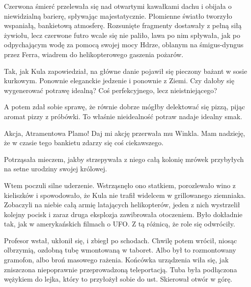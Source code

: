 Czerwona śmierć przelewała się nad otwartymi kawałkami dachu i obijała o niewidzialną barierę, spływając majestatycznie.
Płomienne światło tworzyło wspaniałą, bankietową atmosferę.
Rozsunięte fragmenty dostawały z pełną siłą żywiołu, lecz czerwone futro wcale się nie paliło, lawa po nim spływała, 
jak po odpychającym wodę za pomocą swojej mocy Hdrze, oblanym na śmigus-dyngus przez Ferra, wiadrem do helikopterowego gaszenia pożarów.

Tak, jak Kula zapowiedział, na główne danie pojawił się pieczony bażant w sosie kurkowym.
Ponownie eleganckie jedzenie i ponownie z Ziemi. 
Czy dałoby się wygenerować potrawę idealną? 
Coś perfekcyjnego, lecz nieistniejącego?

A potem zdał sobie sprawę, że równie dobrze mógłby delektować się pizzą, pijąc aromat pizzy z próbówki.
To właśnie nieidealność potraw nadaje idealny smak.

\divider{} 

\begin{dialogue}
\ds{} Akcja, Atramentowa Plamo! Daj mi akcję \dm{} przerwała mu Winkla. \dm{} Mam nadzieję, że w czasie tego bankietu zdarzy się coś ciekawszego.
\end{dialogue}
Potrząsała mieczem, jakby strzepywała z niego całą kolonię mrówek przybyłych na setne urodziny swojej królowej.

\divider{}

Wtem poczuli silne uderzenie. Wstrząsnęło ono statkiem, porozlewało wino z kieliszków i spowodowało, że Kula nie trafił widelcem w grillowanego ziemniaka.
Zobaczyli na niebie całą armię latających helikopterów, jeden z nich wystrzelił kolejny pocisk i zaraz druga eksplozja zawibrowała otoczeniem.
Było dokładnie tak, jak w amerykańskich filmach o UFO. Z tą różnicą, że role się odwróciły.

Profesor wstał, ukłonił się, i zbiegł po schodach. Chwilę potem wrócił, niosąc olbrzymią, ozdobną tubę wmontowaną w taboret. 
Albo był to rozmontowany gramofon, albo broń masowego rażenia. Końcówka urządzenia wiła się, jak zniszczona niepoprawnie przeprowadzoną teleportacją.
Tuba była podłączona wężykiem do lejka, który to przyłożył sobie do ust.
Skierował otwór w górę.


